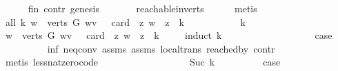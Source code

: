 \begin{isabellebody}
\ \ \ \ \isamarkupfalse%
\ fin\ contr\ genesis\ \isanewline
\ \ \ \ \ \ reachable{}{\isacharunderscore}{\kern0pt}in{\isacharunderscore}{\kern0pt}verts{\isacharparenleft}{\kern0pt}{}{\isacharparenright}{\kern0pt}\isanewline
\ \ \ \ \isamarkupfalse%
\ metis\ \ \ \ \isanewline
\ \ \isamarkupfalse%
\ all{\isacharcolon}{\kern0pt}\ {\isachardoublequoteopen}{\isasymforall}k{\isachardot}{\kern0pt}\ {\isasymexists}w\ {\isasymin}\ verts\ G{\isachardot}{\kern0pt}\ w{\isasymrightarrow}\isactrlsup {\isacharplus}{\kern0pt}v\ {\isasymand}\ \ card\ \ {\isacharbraceleft}{\kern0pt}z{\isachardot}{\kern0pt}\ w\ {\isasymrightarrow}\isactrlsup {\isacharplus}{\kern0pt}\ z{\isacharbraceright}{\kern0pt}\ {\isachargreater}{\kern0pt}\ k{\isachardoublequoteclose}\ \isanewline
\ \ \isamarkupfalse%
\ \isanewline
\ \ \ \ \isamarkupfalse%
\ k\ \isanewline
\ \ \ \ \isamarkupfalse%
\ {\isachardoublequoteopen}{\isasymexists}w\ {\isasymin}\ verts\ G{\isachardot}{\kern0pt}\ w{\isasymrightarrow}\isactrlsup {\isacharplus}{\kern0pt}v\ {\isasymand}\ \ card\ \ {\isacharbraceleft}{\kern0pt}z{\isachardot}{\kern0pt}\ w\ {\isasymrightarrow}\isactrlsup {\isacharplus}{\kern0pt}\ z{\isacharbraceright}{\kern0pt}\ {\isachargreater}{\kern0pt}\ k{\isachardoublequoteclose}\isanewline
\ \ \ \ \isamarkupfalse%
{\isacharparenleft}{\kern0pt}induct\ k\ {\isacharparenright}{\kern0pt}\isanewline
\ \ \ \ \ \ \isamarkupfalse%
\ {}\isanewline
\ \ \ \ \ \ \isamarkupfalse%
\ \isamarkupfalse%
\ {\isacharquery}{\kern0pt}case\ \isanewline
\ \ \ \ \ \ \ \ \isamarkupfalse%
\ inf\ neq{}{\isacharunderscore}{\kern0pt}conv\ assms{\isacharparenleft}{\kern0pt}{}{\isacharparenright}{\kern0pt}\ assms{\isacharparenleft}{\kern0pt}{}{\isacharparenright}{\kern0pt}\ local{\isachardot}{\kern0pt}trans\ reached{\isacharunderscore}{\kern0pt}by\ contr\isanewline
\ \ \ \ \ \ \ \ \isamarkupfalse%
\ {\isacharparenleft}{\kern0pt}metis\ less{\isacharunderscore}{\kern0pt}nat{\isacharunderscore}{\kern0pt}zero{\isacharunderscore}{\kern0pt}code{\isacharparenright}{\kern0pt}\ \ \ \ \ \ \isanewline
\ \ \ \ \isamarkupfalse%
\isanewline
\ \ \ \ \ \ \isamarkupfalse%
\ {\isacharparenleft}{\kern0pt}Suc\ k{\isacharparenright}{\kern0pt}\isanewline
\ \ \ \ \ \ \isamarkupfalse%
\ \isamarkupfalse%
\ {\isacharquery}{\kern0pt}case\isanewline

\end{isabellebody}
